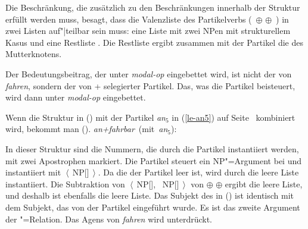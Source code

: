 \noindent
Die Beschränkung, die zusätzlich zu den Beschränkungen innerhalb der Struktur erfüllt werden muss,
besagt, dass die Valenzliste des Partikelverbs (\, $\oplus$  $\oplus$ \,) 
in zwei Listen auf"|teilbar sein muss: eine Liste mit zwei NPen mit strukturellem Kasus und eine
Restliste . Die Restliste ergibt zusammen mit der Partikel die \compsl des Mutterknotens.

Der Bedeutungsbeitrag, der unter \emph{modal-op} eingebettet wird, ist nicht
der von \emph{fahren}, sondern der von  + selegierter Partikel. Das, was
die Partikel beisteuert, wird dann unter \emph{modal-op} eingebettet.

Wenn die Struktur in () mit der Partikel \emph{an$_5$} in (\ref{le-an5}) auf Seite~\pageref{le-an5}
kombiniert wird, bekommt man ().
\eas
\label{le-anfahrbar}
\mbox{\emph{an+fahrbar} (mit \emph{an$_5$}):}\\
\zs
%

\noindent
In dieser Struktur sind die Nummern, die durch die Partikel instantiiert werden, mit zwei Apostrophen markiert.
Die Partikel steuert ein NP"=Argument bei und instantiiert  mit 
$\left\langle\right.$\,NP[\str]\,$\left.\right\rangle$.
Da die \compsl der Partikel leer ist, wird  durch die leere Liste instantiiert. 
Die Subtraktion von $\left\langle\right.$\,NP[\str], ~NP[\str]\,$\left.\right\rangle$ von
 $\oplus$  $\oplus$  ergibt die leere Liste, und deshalb ist
 ebenfalls die leere Liste. Das Subjekt des \baradjs in () ist identisch
mit dem Subjekt, das von der Partikel eingeführt wurde. Es ist das zweite Argument der
"=Relation. Das Agens von \emph{fahren} wird unterdrückt.
\iw{\bars|)}

